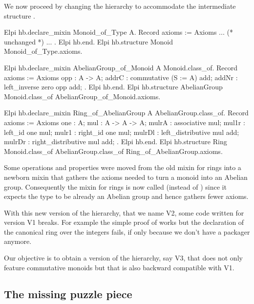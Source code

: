 \documentclass[a4paper,UKenglish,cleveref, autoref]{lipics-v2019}
\newcommand{\mixin}{mixin}
\newcommand{\packager}{packager}
\theoremstyle{implem}
\theoremstyle{implem}
\theoremstyle{axiom}
\theoremstyle{abscommand}
\theoremstyle{command}
\begin{document}
We now proceed by changing the hierarchy to accommodate the intermediate
structure .

\begin{coqcode}
Elpi hb.declare_mixin Monoid_of_Type A.
  Record axioms := Axioms { ... (* unchanged *) ... }.
Elpi hb.end.
Elpi hb.structure Monoid Monoid_of_Type.axioms.

Elpi hb.declare_mixin AbelianGroup_of_Monoid A Monoid.class_of.
  Record axioms := Axioms {
    opp : A -> A;
    addrC : commutative (S := A) add;
    addNr : left_inverse zero opp add;
  }.
Elpi hb.end.
Elpi hb.structure AbelianGroup Monoid.class_of AbelianGroup_of_Monoid.axioms.

Elpi hb.declare_mixin Ring_of_AbelianGroup A AbelianGroup.class_of.
  Record axioms := Axioms {
    one : A;
    mul : A -> A -> A;
    mulrA : associative mul;
    mul1r : left_id one mul;
    mulr1 : right_id one mul;
    mulrDl : left_distributive mul add;
    mulrDr : right_distributive mul add;
  }.
Elpi hb.end.
Elpi hb.structure Ring Monoid.class_of AbelianGroup.class_of Ring_of_AbelianGroup.axioms.
\end{coqcode}

Some operations and properties were moved from the old \mixin{} for rings
into a newborn \mixin{}  that gathers the
axioms needed to turn a monoid into an Abelian group. Consequently the \mixin{}
for rings is now called  (instead of )
since it expects the type  to be already an Abelian group and hence
gathers fewer axioms.


With this new version of the hierarchy, that we name V2, some code written
for version V1 breaks. For example the simple proof of  works
but the declaration of the canonical ring over the integers fails, if only
because we don't have a  \packager{} anymore.

Our objective is to obtain a version of the hierarchy, say V3, that does
not only feature commutative monoids but that is also backward compatible
with V1.

\subsection{The missing puzzle piece}
\end{document}
